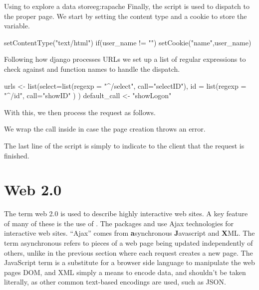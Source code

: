 \begin{example}{Using  to explore a data store}{eg:rapache}
Finally, the script is used to dispatch to the proper page. We start
by setting the content type and a cookie to store the
 variable.
\begin{Schunk}
\begin{Sinput}
 setContentType("text/html")
 if(user_name != "")
   setCookie("name",user_name)
\end{Sinput}
\end{Schunk}

Following how django processes URLs we set up a list of regular
expressions to check against  and function names to handle the dispatch.
\begin{Schunk}
\begin{Sinput}
 urls <- list(select=list(regexp = "^/select", call="selectID"),
              id =   list(regexp = "^/id",     call="showID" )
              )
 default_call <- "showLogon"
\end{Sinput}
\end{Schunk}

With this, we then process the request as follows.
\begin{Schunk}
\end{Schunk}
We wrap the call inside  in case the page creation
throws an error.

The last line of the script is simply  to indicate to the
client that the request is finished.
\end{example}



\section{Web 2.0}
\label{sec:web-2.0}


The term web 2.0 is used to describe highly interactive web sites. A
key feature of many of these is the use of . The packages  and  use
Ajax technologies for interactive web sites. ``Ajax'' comes from
\textbf{a}synchronous \textbf{J}avascript and \textbf{X}ML. The term
asynchronous refers to pieces of a web page being updated
independently of others, unlike in the previous section where each
request creates a new page. The JavaScript term is a substitute for a
browser side language to manipulate the web pages DOM, and XML simply
a means to encode data, and shouldn't be taken literally, as other
common text-based encodings are used, such as JSON.

